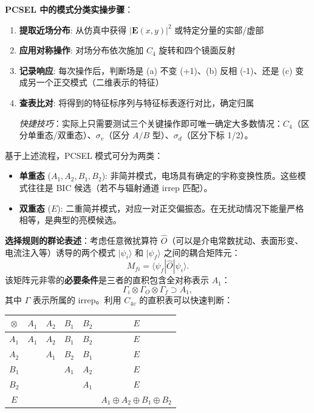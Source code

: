 \textbf{PCSEL 中的模式分类实操步骤}：
\begin{enumerate}
  \item \textbf{提取近场分布}: 从仿真中获得 $|\mathbf{E}(x,y)|^2$ 或特定分量的实部/虚部
  \item \textbf{应用对称操作}: 对场分布依次施加 $C_4$ 旋转和四个镜面反射
  \item \textbf{记录响应}: 每次操作后，判断场是 (a) 不变 (+1)、(b) 反相 (-1)、还是 (c) 变成另一个正交模式（二维表示的特征）
  \item \textbf{查表比对}: 将得到的特征标序列与特征标表逐行对比，确定归属
  
  \textit{快捷技巧}：实际上只需要测试三个关键操作即可唯一确定大多数情况：$C_4$（区分单重态/双重态）、$\sigma_v$（区分 $A/B$ 型）、$\sigma_d$（区分下标 1/2）。
\end{enumerate}

基于上述流程，PCSEL 模式可分为两类：
\begin{itemize}
  \item \textbf{单重态} ($A_1, A_2, B_1, B_2$): 非简并模式，电场具有确定的宇称变换性质。这些模式往往是 BIC 候选（若不与辐射通道 irrep 匹配）。
  \item \textbf{双重态} ($E$): 二重简并模式，对应一对正交偏振态。在无扰动情况下能量严格相等，是典型的亮模候选。
\end{itemize}

\textbf{选择规则的群论表述}：考虑任意微扰算符 $\hat{O}$（可以是介电常数扰动、表面形变、电流注入等）诱导的两个模式 $|\psi_i\rangle$ 和 $|\psi_f\rangle$ 之间的耦合矩阵元：
\begin{equation}
M_{fi} = \langle\psi_f|\hat{O}|\psi_i\rangle.
\end{equation}
该矩阵元非零的\textbf{必要条件}是三者的直积包含全对称表示 $A_1$：
\begin{equation}
\Gamma_i \otimes \Gamma_O \otimes \Gamma_f \supset A_1,
\label{eq:selection_rule_general}
\end{equation}
其中 $\Gamma$ 表示所属的 irrep。利用 $C_{4v}$ 的直积表可以快速判断：
\begin{center}
\small
\begin{tabular}{c||cccc|c}
$\otimes$ & $A_1$ & $A_2$ & $B_1$ & $B_2$ & $E$ \\ \hline\hline
$A_1$ & $A_1$ & $A_2$ & $B_1$ & $B_2$ & $E$ \\
$A_2$ &       & $A_1$ & $B_2$ & $B_1$ & $E$ \\
$B_1$ &       &       & $A_1$ & $A_2$ & $E$ \\
$B_2$ &       &       &       & $A_1$ & $E$ \\
$E$   &       &       &       &       & $A_1\oplus A_2\oplus B_1\oplus B_2$ \\
\end{tabular}
\end{center}

